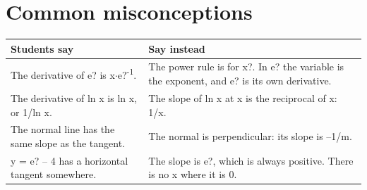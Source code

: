 \documentclass[11pt]{article}
\begin{document}
\section*{Common misconceptions}\begin{tabularx}{\textwidth}{@{}X X@{}}\toprule Students say & Say instead\\\midrule
The derivative of e? is x$\cdot$e?\textsuperscript{-1}. & The power rule is for x?. In e? the variable is the exponent, and e? is its own derivative.\\
The derivative of ln x is ln x, or 1/ln x. & The slope of ln x at x is the reciprocal of x: 1/x.\\
The normal line has the same slope as the tangent. & The normal is perpendicular: its slope is --1/m.\\
y = e? -- 4 has a horizontal tangent somewhere. & The slope is e?, which is always positive. There is no x where it is 0.\\
\bottomrule\end{tabularx}
\end{document}
